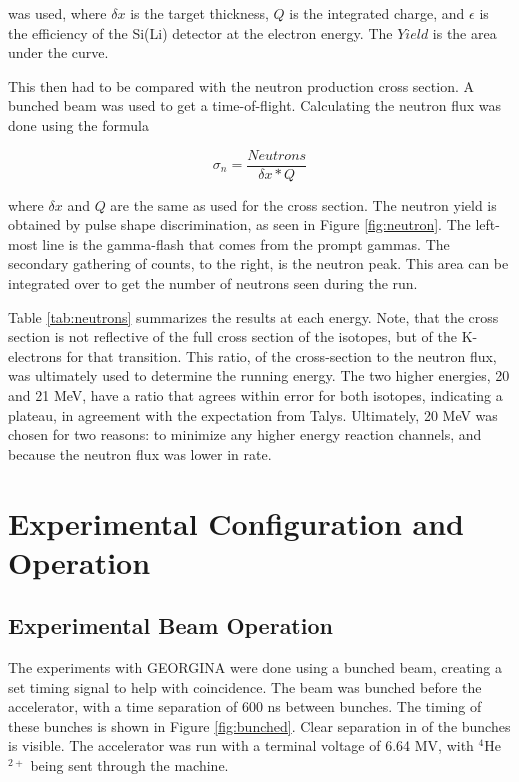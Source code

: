 was used, where $\delta x$ is the target thickness, $Q$ is the integrated charge, and $\epsilon$ is the efficiency of the Si(Li) detector at the electron energy. The $Yield$ is the area under the curve.

This then had to be compared with the neutron production cross section. A bunched beam was used to get a time-of-flight. Calculating the neutron flux was done using the formula

\begin{equation}
    \sigma_n = \frac{Neutrons}{\delta x*Q}
\end{equation}

where $\delta x$ and $Q$ are the same as used for the cross section. The neutron yield is obtained by pulse shape discrimination, as seen in Figure \ref{fig:neutron}. The left-most line is the gamma-flash that comes from the prompt gammas. The secondary gathering of counts, to the right, is the neutron peak. This area can be integrated over to get the number of neutrons seen during the run.

Table \ref{tab:neutrons} summarizes the results at each energy. Note, that the cross section is not reflective of the full cross section of the isotopes, but of the K-electrons for that transition. This ratio, of the cross-section to the neutron flux, was ultimately used to determine the running energy. The two higher energies, 20 and 21 MeV, have a ratio that agrees within error for both isotopes, indicating a plateau, in agreement with the expectation from Talys. Ultimately, 20 MeV was chosen for two reasons: to minimize any higher energy reaction channels, and because the neutron flux was lower in rate.



\section{Experimental Configuration and Operation}

\subsection{Experimental Beam Operation}

The experiments with GEORGINA were done using a bunched beam, creating a set timing signal to help with coincidence. The beam was bunched before the accelerator, with a time separation of 600 ns between bunches. The timing of these bunches is shown in Figure \ref{fig:bunched}. Clear separation in of the bunches is visible. The accelerator was run with a terminal voltage of 6.64 MV, with $^{4}$He$^{2+}$ being sent through the machine. 

